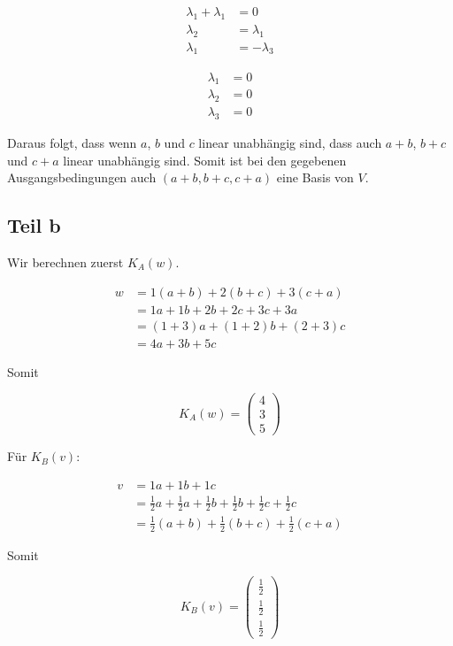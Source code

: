 \documentclass[a4paper,german,12pt,smallheadings]{scrartcl}
\begin{document}
\begin{align*}
  \lambda_1 + \lambda_1 &= 0 \\
  \lambda_2 &= \lambda_1 \\
  \lambda_1 &= -\lambda_3
\end{align*}

\begin{align*}
  \lambda_1 &= 0 \\
  \lambda_2 &= 0 \\
  \lambda_3 &= 0
\end{align*}

Daraus folgt, dass wenn $a$, $b$ und $c$ linear unabhängig sind, dass auch
$a+b$, $b+c$ und $c+a$ linear unabhängig sind. Somit ist bei den gegebenen
Ausgangsbedingungen auch $(a+b, b+c, c+a)$ eine Basis von $V$.


\subsection*{Teil b}

Wir berechnen zuerst $K_A(w)$.

\begin{align*}
  w &= 1(a+b) + 2(b+c) + 3(c+a) \\
    &= 1a + 1b + 2b + 2c + 3c + 3a \\
    &= (1+3)a + (1+2)b + (2+3)c \\
    &= 4a + 3b + 5c
\end{align*}

Somit

\begin{equation*}
  K_A(w) = \begin{pmatrix} 4 \\ 3 \\ 5 \end{pmatrix}
\end{equation*}

Für $K_B(v)$:

\begin{align*}
  v &= 1a + 1b + 1c \\
    &= \frac{1}{2}a + \frac{1}{2}a + \frac{1}{2}b + \frac{1}{2}b + \frac{1}{2}c + \frac{1}{2} c \\
    &= \frac{1}{2}(a+b) + \frac{1}{2}(b+c) + \frac{1}{2}(c+a)
\end{align*}

Somit

\begin{equation*}
  K_B(v) = \begin{pmatrix} \frac{1}{2} \\ \frac{1}{2} \\ \frac{1}{2} \end{pmatrix}
\end{equation*}
\end{document}
